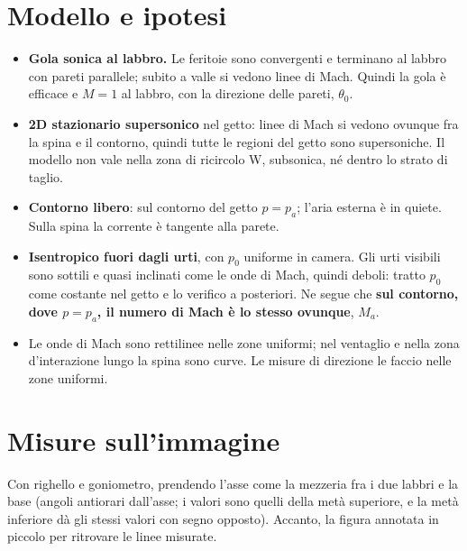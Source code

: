 \documentclass[11pt,a4paper]{article}
\begin{document}
\section{Modello e ipotesi}
\begin{itemize}
\item \textbf{Gola sonica al labbro.} Le feritoie sono convergenti e terminano al labbro con pareti parallele; subito a
  valle si vedono linee di Mach. Quindi la gola è efficace e $M=1$ al labbro, con la direzione delle pareti,
  $\theta_0$.
\item \textbf{2D stazionario supersonico} nel getto: linee di Mach si vedono ovunque fra la spina e il contorno, quindi
  tutte le regioni del getto sono supersoniche. Il modello non vale nella zona di ricircolo W, subsonica, né dentro lo
  strato di taglio.
\item \textbf{Contorno libero}: sul contorno del getto $p=p_a$; l'aria esterna è in quiete. Sulla spina la corrente è
  tangente alla parete.
\item \textbf{Isentropico fuori dagli urti}, con $p_0$ uniforme in camera. Gli urti visibili sono sottili e quasi
  inclinati come le onde di Mach, quindi deboli: tratto $p_0$ come costante nel getto e lo verifico a posteriori.
  Ne segue che \textbf{sul contorno, dove $p=p_a$, il numero di Mach è lo stesso ovunque}, $M_a$.
\item Le onde di Mach sono rettilinee nelle zone uniformi; nel ventaglio e nella zona d'interazione lungo la spina
  sono curve. Le misure di direzione le faccio nelle zone uniformi.
\end{itemize}

\section{Misure sull'immagine}
Con righello e goniometro, prendendo l'asse come la mezzeria fra i due labbri e la base (angoli antiorari
dall'asse; i valori sono quelli della metà superiore, e la metà inferiore dà gli stessi valori con segno opposto).
Accanto, la figura annotata in piccolo per ritrovare le linee misurate.
\end{document}
